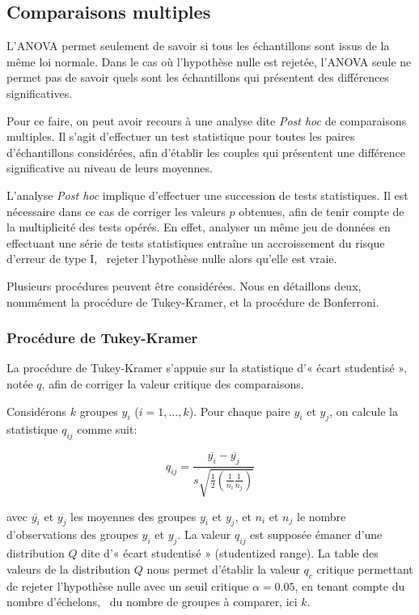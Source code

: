 \subsection{Comparaisons multiples}

L'ANOVA permet seulement de savoir si tous les échantillons sont issus de la même loi normale. Dans le cas où l'hypothèse nulle est rejetée, l'ANOVA seule ne permet pas de savoir quels sont les échantillons qui présentent des différences significatives. 

Pour ce faire, on peut avoir recours à une analyse dite \emph{Post hoc} de comparaisons multiples. Il s'agit d'effectuer un test statistique pour toutes les paires d'échantillons considérées, afin d'établir les couples qui présentent une différence significative au niveau de leurs moyennes. 

L'analyse \emph{Post hoc} implique d'effectuer une succession de tests statistiques. Il est nécessaire dans ce cas de corriger les valeurs $p$ obtenues, afin de tenir compte de la multiplicité des tests opérés. En effet, analyser un même jeu de données en effectuant une série de tests statistiques entraîne un accroissement du risque d'erreur de type I, \ie~rejeter l'hypothèse nulle alors qu'elle est vraie.

Plusieurs procédures peuvent être considérées. Nous en détaillons deux, nommément la procédure de Tukey-Kramer, et la procédure de Bonferroni.

\subsubsection{Procédure de Tukey-Kramer}

La procédure de Tukey-Kramer s'appuie sur la statistique d'« écart studentisé », notée $q$, afin de corriger la valeur critique des comparaisons. 

Considérons $k$ groupes $y_i$ ($i=1,\ldots,k$). Pour chaque paire $y_i$ et $y_j$, on calcule la statistique $q_{ij}$ comme suit: 

\begin{equation}
q_{ij}=\dfrac{\overline{y_{i}}-\overline{y_{j}}}{s\sqrt{\frac{1}{2}(\frac{1}{n_{i}} \frac{1}{n_{j}})}}
\end{equation}

avec $\overline{y_{i}}$ et $\overline{y_{j}}$ les moyennes des groupes $y_i$ et $y_j$, et $n_{i}$ et $n_{j}$ le nombre d'observations des groupes $y_{i}$ et $y_{j}$. La valeur $q_{ij}$ est supposée émaner d'une distribution $Q$ dite d'« écart studentisé » (studentized range). La table des valeurs de la distribution $Q$ nous permet d'établir la valeur $q_c$ critique permettant de rejeter l'hypothèse nulle avec un seuil critique $\alpha=0.05$, en tenant compte du nombre d'échelons, \ie~du nombre de groupes à comparer, ici $k$.

